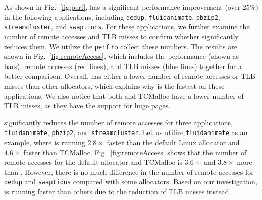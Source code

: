 As shown in Fig.~\ref{fig:perf}, \NM{} has a significant performance improvement (over 25\%) in the following applications, including \texttt{dedup}, \texttt{fluidanimate}, \texttt{pbzip2}, \texttt{streamcluster}, and \texttt{swaptions}. For these applications, we further examine the number of remote accesses and TLB misses to confirm whether \NM{} significantly reduces them. 
We utilize the \texttt{perf} to collect these numbers. 
The results are shown in Fig.~\ref{fig:remoteAccess}, which includes the performance (shown as bars), remote accesses (red lines), and TLB misses (blue lines) together for a better comparison. 
Overall, \NM{} has either a lower number of remote accesses or TLB misses than other allocators, which explains why \NM{} is the fastest on these applications. We also notice that both \NM{} and TCMalloc have a lower number of TLB misses, as they have the support for huge pages.   

\NM{} significantly reduces the number of remote accesses for three applications, \texttt{fluidanimate}, \texttt{pbzip2}, and \texttt{streamcluster}. Let us utilize \texttt{fluidanimate} as an example, where \NM{} is running $2.8\times$ faster than the default Linux allocator and $4.6\times$ faster than TCMalloc. Fig.~\ref{fig:remoteAccess} shows that the number of remote accesses for the default allocator and TCMalloc is $3.6\times$ and $3.8\times$ more than \NM{}. However, there is no much difference in the number of remote accesses for \texttt{dedup} and \texttt{swaptions} compared with some allocators. Based on our investigation, \NM{} is running faster than others due to the reduction of TLB misses instead. 

